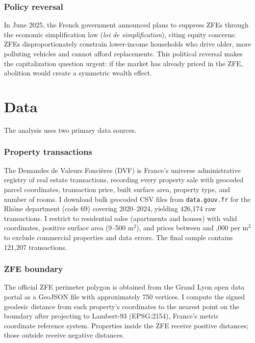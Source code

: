 \documentclass[12pt]{article}
\begin{document}
\subsubsection*{Policy reversal} In June 2025, the French government announced plans to suppress ZFEs through the economic simplification law (\textit{loi de simplification}), citing equity concerns: ZFEs disproportionately constrain lower-income households who drive older, more polluting vehicles and cannot afford replacements. This political reversal makes the capitalization question urgent: if the market has already priced in the ZFE, abolition would create a symmetric wealth effect.


\section{Data}

The analysis uses two primary data sources.

\subsubsection*{Property transactions} The Demandes de Valeurs Fonci\`eres (DVF) is France's universe administrative registry of real estate transactions, recording every property sale with geocoded parcel coordinates, transaction price, built surface area, property type, and number of rooms. I download bulk geocoded CSV files from \texttt{data.gouv.fr} for the Rh\^one department (code 69) covering 2020--2024, yielding 426,174 raw transactions. I restrict to residential sales (apartments and houses) with valid coordinates, positive surface area (9--500 m$^2$), and prices between  and ,000 per m$^2$ to exclude commercial properties and data errors. The final sample contains 121,207 transactions.

\subsubsection*{ZFE boundary} The official ZFE perimeter polygon is obtained from the Grand Lyon open data portal as a GeoJSON file with approximately 750 vertices. I compute the signed geodesic distance from each property's coordinates to the nearest point on the boundary after projecting to Lambert-93 (EPSG:2154), France's metric coordinate reference system. Properties inside the ZFE receive positive distances; those outside receive negative distances.


\end{document}
